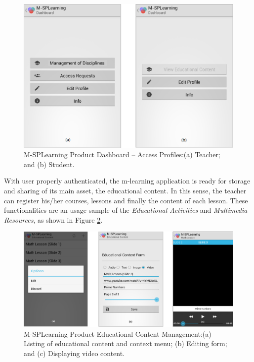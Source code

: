 \begin{figure}[!ht]
\centering
\includegraphics[scale=0.35]{figures/section3/MSPLDashboardApp}
\caption{M-SPLearning Product Dashboard -- Access Profiles:\newline(a) Teacher; and (b) Student.}
\label{figureMSPLDashboardApp}
\end{figure}

With user properly authenticated, the m-learning application is ready for storage and sharing of its main asset, the educational content. In this sense, the teacher can register his/her courses, lessons and finally the content of each lesson. These functionalities are an usage sample of the \textit{Educational Activities} and \textit{Multimedia Resources}, as shown in Figure \ref{figureMSPLEducationalContent}.

\begin{figure}[!ht]
\centering
\includegraphics[scale=0.35]{figures/section3/MSPLEducationalContent}
\caption{M-SPLearning Product Educational Content Management:\newline(a) Listing of educational content and context menu; (b) Editing form; and (c) Displaying video content.}
\label{figureMSPLEducationalContent}
\end{figure}

